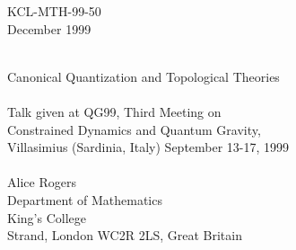 \documentclass[a4paper,fleqn,12pt]{article}
\newcommand{\BRST}{{\small BRST}}
\begin{document}
  \begin{flushright}
 KCL-MTH-99-50\\
 December 1999\\
 \
  \end{flushright}
%
  \begin{center}{\huge Canonical Quantization and Topological Theories}\\
 \ \\
 {\large Talk given at QG99,
 Third Meeting on\\
 Constrained Dynamics and Quantum Gravity,\\
 Villasimius (Sardinia, Italy) September 13-17, 1999\\
 \ \\
%
 Alice Rogers\\
 Department of Mathematics\\
 King's College}\\
 Strand, London WC2R 2LS, Great Britain\\
  \end{center}
 \begin{abstract}
The canonical quantization of the topological particle is
described; it is shown that \BRST\ quantization of the model gives
the supersymmetric quantum mechanical model considered by Witten
when investigating Morse theory, and the rigorous path integral
method appropriate for this model is discussed. Possibilities for
the extension of this work to two dimensional models are briefly
considered.
 \end{abstract}
%
\end{document}
